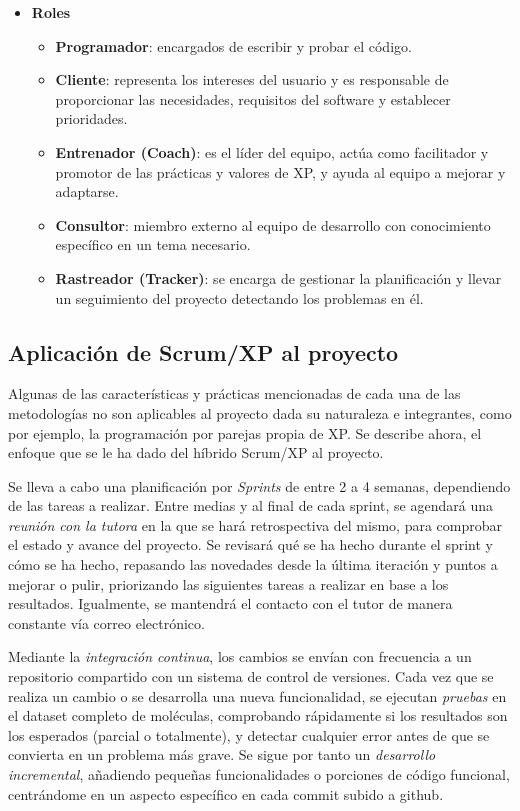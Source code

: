 \begin{itemize}
    \item \textbf{Roles}
    \begin{itemize}
        \item \textbf{Programador}: encargados de escribir y probar el código.
        \item \textbf{Cliente}: representa los intereses del usuario y es responsable de proporcionar las necesidades, requisitos del software y establecer prioridades. 
        \item \textbf{Entrenador (Coach)}: es el líder del equipo, actúa como facilitador y promotor de las prácticas y valores de XP, y ayuda al equipo a mejorar y adaptarse.
        \item \textbf{Consultor}: miembro externo al equipo de desarrollo con conocimiento específico en un tema necesario.
        \item \textbf{Rastreador (Tracker)}: se encarga de gestionar la planificación y llevar un seguimiento del proyecto detectando los problemas en él.
    \end{itemize}
\end{itemize}

\subsection{Aplicación de Scrum/XP al proyecto}

Algunas de las características y prácticas mencionadas de cada una de las metodologías no son aplicables al proyecto dada su naturaleza e integrantes, como por ejemplo, la programación por parejas propia de XP. Se describe ahora, el enfoque que se le ha dado del híbrido Scrum/XP al proyecto.

Se lleva a cabo una planificación por \emph{Sprints} de entre 2 a 4 semanas, dependiendo de las tareas a realizar. Entre medias y al final de cada sprint, se agendará una \emph{reunión con la tutora} en la que se hará retrospectiva del mismo, para comprobar el estado y avance del proyecto. Se revisará qué se ha hecho durante el sprint y cómo se ha hecho, repasando las novedades desde la última iteración y puntos a mejorar o pulir, priorizando las siguientes tareas a realizar en base a los resultados. Igualmente, se mantendrá el contacto con el tutor de manera constante vía correo electrónico.


Mediante la \emph{integración continua}, los cambios se envían con frecuencia a un repositorio compartido con un sistema de control de versiones. Cada vez que se realiza un cambio o se desarrolla una nueva funcionalidad, se ejecutan \emph{pruebas} en el dataset completo de moléculas, comprobando rápidamente si los resultados son los esperados (parcial o totalmente), y detectar cualquier error antes de que se convierta en un problema más grave. Se sigue por tanto un \emph{desarrollo incremental}, añadiendo pequeñas funcionalidades o porciones de código funcional, centrándome en un aspecto específico en cada commit subido a github.

